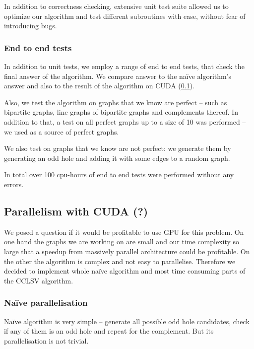 In addition to correctness checking, extensive unit test suite allowed us to optimize our algorithm and test different subroutines with ease, without fear of introducing bugs.

\subsubsection{End to end tests}

In addition to unit tests, we employ a range of end to end tests, that check the final answer of the algorithm. We compare answer to the na\"ive algorithm's answer and also to the result of the algorithm on CUDA (\cref{sec:CUDA}).

Also, we test the algorithm on graphs that we know are perfect -- such as bipartite graphs, line graphs of bipartite graphs and complements thereof. In addition to that, a test on all perfect graphs up to a size of 10 was performed -- we used \cite{graphRepo} as a source of perfect graphs.

We also test on graphs that we know are not perfect: we generate them by generating an odd hole and adding it with some edges to a random graph.

In total over 100 cpu-hours of end to end tests were performed without any errors.

\subsection{Parallelism with CUDA (?)}
\label{sec:CUDA}


We posed a question if it would be profitable to use GPU for this problem. On one hand the graphs we are working on are small and our time complexity so large that a speedup from massively parallel architecture could be profitable. On the other the algorithm is complex and not easy to parallelise. Therefore we decided to implement whole na\"ive algorithm and most time consuming parts of the CCLSV algorithm.

\subsubsection{Na\"ive parallelisation}

Na\"ive algorithm is very simple -- generate all possible odd hole candidates, check if any of them is an odd hole and repeat for the complement. But its parallelisation is not trivial.

